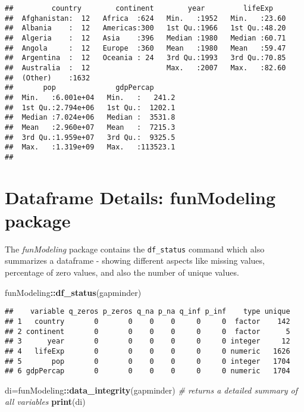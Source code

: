 \documentclass[]{book}
\newenvironment{Shaded}{\begin{snugshade}}{\end{snugshade}}
\newcommand{\KeywordTok}[1]{\textcolor[rgb]{0.13,0.29,0.53}{\textbf{#1}}}
\newcommand{\CommentTok}[1]{\textcolor[rgb]{0.56,0.35,0.01}{\textit{#1}}}
\newcommand{\OperatorTok}[1]{\textcolor[rgb]{0.81,0.36,0.00}{\textbf{#1}}}
\newcommand{\NormalTok}[1]{#1}
\begin{document}
\begin{verbatim}
##         country        continent        year         lifeExp     
##  Afghanistan:  12   Africa  :624   Min.   :1952   Min.   :23.60  
##  Albania    :  12   Americas:300   1st Qu.:1966   1st Qu.:48.20  
##  Algeria    :  12   Asia    :396   Median :1980   Median :60.71  
##  Angola     :  12   Europe  :360   Mean   :1980   Mean   :59.47  
##  Argentina  :  12   Oceania : 24   3rd Qu.:1993   3rd Qu.:70.85  
##  Australia  :  12                  Max.   :2007   Max.   :82.60  
##  (Other)    :1632                                                
##       pop              gdpPercap       
##  Min.   :6.001e+04   Min.   :   241.2  
##  1st Qu.:2.794e+06   1st Qu.:  1202.1  
##  Median :7.024e+06   Median :  3531.8  
##  Mean   :2.960e+07   Mean   :  7215.3  
##  3rd Qu.:1.959e+07   3rd Qu.:  9325.5  
##  Max.   :1.319e+09   Max.   :113523.1  
## 
\end{verbatim}

\section{Dataframe Details: funModeling
package}\label{dataframe-details-funmodeling-package}

The \emph{funModeling} package contains the \texttt{df\_status} command
which also summarizes a dataframe - showing different aspects like
missing values, percentage of zero values, and also the number of unique
values.

\begin{Shaded}
\begin{Highlighting}[]
\NormalTok{funModeling}\OperatorTok{::}\KeywordTok{df_status}\NormalTok{(gapminder)}
\end{Highlighting}
\end{Shaded}

\begin{verbatim}
##    variable q_zeros p_zeros q_na p_na q_inf p_inf    type unique
## 1   country       0       0    0    0     0     0  factor    142
## 2 continent       0       0    0    0     0     0  factor      5
## 3      year       0       0    0    0     0     0 integer     12
## 4   lifeExp       0       0    0    0     0     0 numeric   1626
## 5       pop       0       0    0    0     0     0 integer   1704
## 6 gdpPercap       0       0    0    0     0     0 numeric   1704
\end{verbatim}

\begin{Shaded}
\begin{Highlighting}[]
\NormalTok{di=funModeling}\OperatorTok{::}\KeywordTok{data_integrity}\NormalTok{(gapminder)}
\CommentTok{# returns a detailed summary of all variables}
\KeywordTok{print}\NormalTok{(di)}
\end{Highlighting}
\end{Shaded}
\end{document}
